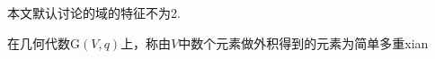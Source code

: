 
本文默认讨论的域的特征不为2.

\begin{definition}{}
在几何代数$\mathrm G(V,q)$上，称由$V$中数个元素做外积得到的元素为简单多重xian
\end{definition}